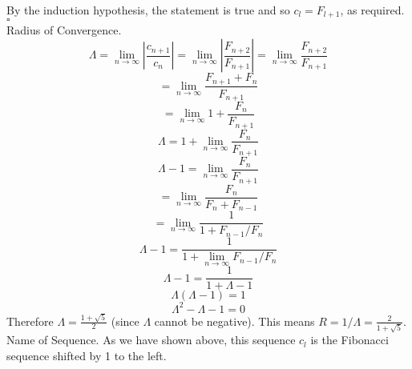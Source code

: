 \documentclass[11pt]{article}
\begin{document}
By the induction hypothesis, the statement is true and so $c_l=F_{l+1}$, as required. $\square$\\
Radius of Convergence.
$$\Lambda = \lim_{n\to\infty}\left|\frac{c_{n+1}}{c_{n}} \right| = \lim_{n\to\infty}\left|\frac{F_{n+2}}{F_{n+1}} \right|= \lim_{n\to\infty}\frac{F_{n+2}}{F_{n+1}}$$
$$= \lim_{n\to\infty}\frac{F_{n+1}+F_{n}}{F_{n+1}}$$
$$= \lim_{n\to\infty}1+\frac{F_{n}}{F_{n+1}}$$
$$\Lambda= 1+\lim_{n\to\infty}\frac{F_{n}}{F_{n+1}}$$
$$\Lambda-1=\lim_{n\to\infty}\frac{F_{n}}{F_{n+1}}$$
$$=\lim_{n\to\infty}\frac{F_{n}}{F_{n}+F_{n-1}}$$
$$=\lim_{n\to\infty}\frac{1}{1+F_{n-1}/F_n}$$
$$\Lambda-1=\frac{1}{1+\lim_{n\to\infty}F_{n-1}/F_n} $$
$$\Lambda-1=\frac{1}{1+\Lambda-1} $$
$$\Lambda\left(\Lambda-1\right)=1 $$
$$\Lambda^2-\Lambda-1=0 $$
Therefore $\displaystyle\Lambda=\frac{1+\sqrt{5}}{2}$ (since $\Lambda$ cannot be negative). This means $R=1/\Lambda=\displaystyle\frac{2}{1+\sqrt{5}}$.\\
Name of Sequence. As we have shown above, this sequence $c_l$ is the Fibonacci sequence shifted by 1 to the left.
\end{document}
